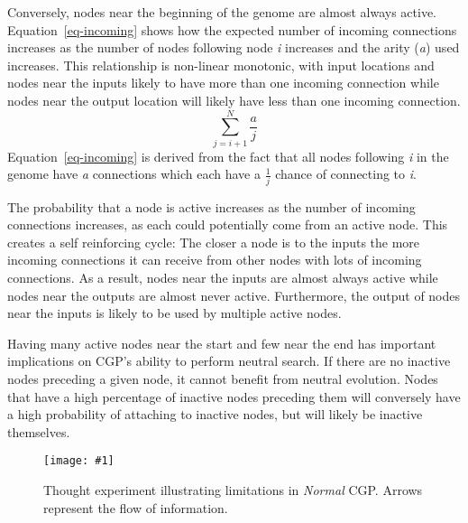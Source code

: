 \documentclass{sig-alternate}
\newcommand{\includegraphicsfit}[1]
{\texttt{[image: \#1]}}
\begin{document}
Conversely, nodes near the beginning of the genome are almost always active.
Equation~\ref{eq-incoming} shows how the expected number of incoming connections
increases as the number of nodes following node \emph{i} increases and the
arity (\emph{a}) used increases.  This relationship is non-linear monotonic, with input locations
and nodes near the inputs likely to have more than one incoming connection while nodes
near the output location will likely have less than one incoming connection.
\begin{equation}
  \sum_{j=i+1}^{N} \frac{a}{j}
  \label{eq-incoming}
\end{equation}
Equation~\ref{eq-incoming} is derived from the fact that all nodes following \emph{i}
in the genome have \emph{a} connections which each have a $\frac{1}{j}$ chance of
connecting to \emph{i}.

The probability that a node is active increases as the number of incoming connections
increases, as each could potentially come from an active node.  This creates a self
reinforcing cycle:  The closer a node is to the inputs the more incoming connections
it can receive from other nodes with lots of incoming connections.
As a result, nodes near the inputs are almost
always active while nodes near the outputs are almost never active.  Furthermore,
the output of nodes near the inputs is likely to be used by multiple active nodes.

Having many active nodes near the start and few near the end has important
implications on CGP's ability to perform neutral search.
If there are no inactive nodes preceding a given
node, it cannot benefit from neutral evolution.  Nodes that have a high percentage
of inactive nodes preceding them will conversely have a high probability of attaching
to inactive nodes, but will likely be inactive themselves.

\begin{figure}
  \centering
  \includegraphicsfit{ThoughtExperiment}
  \caption{Thought experiment illustrating limitations in \emph{Normal} CGP.
           Arrows represent the flow of information.} 
  \label{fig-thought}
\end{figure}
\end{document}
